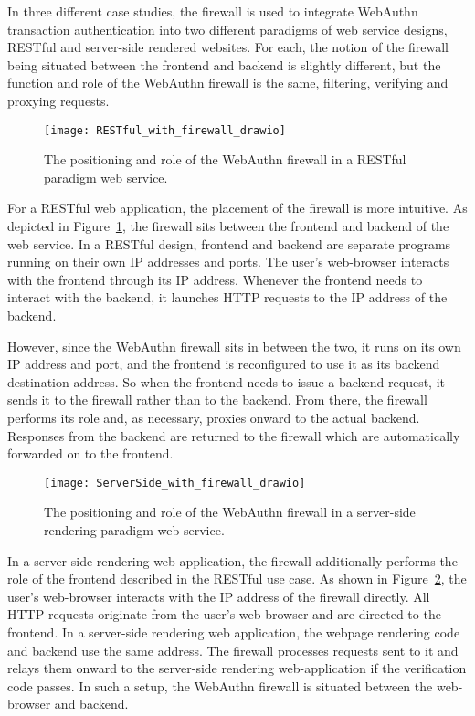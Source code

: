 In three different case studies, the firewall is used to integrate WebAuthn transaction authentication into two different paradigms of web service designs, RESTful and server-side rendered websites. For each, the notion of the firewall being situated between the frontend and backend is slightly different, but the function and role of the WebAuthn firewall is the same, filtering, verifying and proxying requests. 

\begin{figure}[h]
  \centering
  \texttt{[image: RESTful\_with\_firewall\_drawio]}
  \caption{The positioning and role of the WebAuthn firewall in a RESTful paradigm web service.}\label{Fig:ProxyingRequestsRESTful}
\end{figure}

For a RESTful web application, the placement of the firewall is more intuitive. As depicted in Figure~\ref{Fig:ProxyingRequestsRESTful}, the firewall sits between the frontend and backend of the web service. In a RESTful design, frontend and backend are separate programs running on their own IP addresses and ports. The user's web-browser interacts with the frontend through its IP address. Whenever the frontend needs to interact with the backend, it launches HTTP requests to the IP address of the backend. 

However, since the WebAuthn firewall sits in between the two, it runs on its own IP address and port, and the frontend is reconfigured to use it as its backend destination address. So when the frontend needs to issue a backend request, it sends it to the firewall rather than to the backend. From there, the firewall performs its role and, as necessary, proxies onward to the actual backend. Responses from the backend are returned to the firewall which are automatically forwarded on to the frontend. 

\begin{figure}[h]
  \centering
  \texttt{[image: ServerSide\_with\_firewall\_drawio]}
  \caption{The positioning and role of the WebAuthn firewall in a server-side rendering paradigm web service.}\label{Fig:ProxyingRequestsServerSide}
\end{figure}

In a server-side rendering web application, the firewall additionally performs the role of the frontend described in the RESTful use case. As shown in Figure~\ref{Fig:ProxyingRequestsServerSide}, the user's web-browser interacts with the IP address of the firewall directly. All HTTP requests originate from the user's web-browser and are directed to the frontend. In a server-side rendering web application, the webpage rendering code and backend use the same address. The firewall processes requests sent to it and relays them onward to the server-side rendering web-application if the verification code passes. In such a setup, the WebAuthn firewall is situated between the web-browser and backend.

